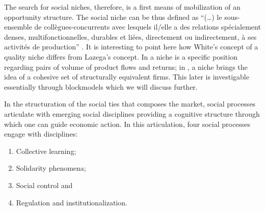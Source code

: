 \documentclass[a4paper, 12pt, openright, oneside, german, french, brazil, english, article]{abntex2}
\begin{document}
	The search for social niches, therefore, is a first means of mobilization of an opportunity structure. The social niche can be thus defined as ``(\dots) le sous-ensemble de collègues-concurrents avec lesquels il/elle a des relations spécialement denses, multifonctionnelles, durables et liées, directement ou indirectement, à ses activités de production'' \cite[p. 575]{lazega2009theorie}. It is interesting to point here how White's concept of a quality niche differs from Lazega's concept. In  a niche is a specific position regarding pairs of volume of product flows and returns; in , a niche brings the idea of a cohesive set of structurally equivalent firms. This later is investigable essentially through blockmodels which we will discuss further.
	
	
	In the structuration of the social ties that composes the market, social processes  articulate with emerging social disciplines providing a cognitive structure through which one can guide economic action. In this articulation, four social processes engage with disciplines:
	
	\begin{enumerate}
		\item Collective learning;
		\item Solidarity phenomena;
		\item Social control and
		\item Regulation and institutionalization.
	\end{enumerate}
	
	
\end{document}
